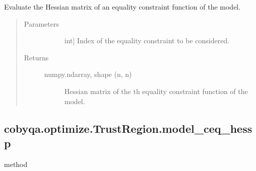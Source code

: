 \documentclass[letterpaper,10pt,english]{sphinxmanual}
\begin{document}
\begin{fulllineitems}
\begin{fulllineitems}
\label{\detokenize{refs/generated/cobyqa.optimize.TrustRegion.model_ceq_hess:cobyqa.optimize.TrustRegion.model_ceq_hess}}
\sphinxAtStartPar
Evaluate the Hessian matrix of an equality constraint function of the
model.
\begin{quote}\begin{description}
\item[{Parameters}] \leavevmode\begin{description}
\item[{}] \leavevmode{[}int{]}
\sphinxAtStartPar
Index of the equality constraint to be considered.

\end{description}

\item[{Returns}] \leavevmode\begin{description}
\item[{numpy.ndarray, shape (n, n)}] \leavevmode
\sphinxAtStartPar
Hessian matrix of the \sphinxhyphen{}th equality constraint function of the
model.

\end{description}

\end{description}\end{quote}

\end{fulllineitems}



\subsection{cobyqa.optimize.TrustRegion.model\_ceq\_hessp}
\label{\detokenize{refs/generated/cobyqa.optimize.TrustRegion.model_ceq_hessp:cobyqa-optimize-trustregion-model-ceq-hessp}}\label{\detokenize{refs/generated/cobyqa.optimize.TrustRegion.model_ceq_hessp::doc}}
\sphinxAtStartPar
method


\end{fulllineitems}
\end{document}
